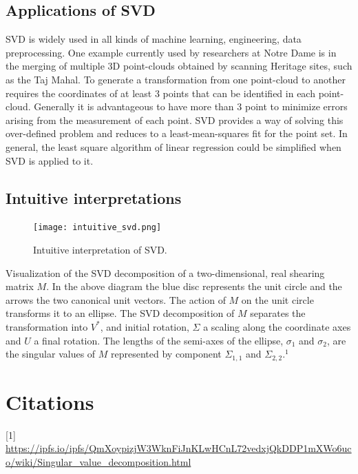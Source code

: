 \documentclass[a4paper]{article}
\begin{document}
\subsection{Applications of SVD}
\noindent SVD is widely used in all kinds of machine learning, engineering, data preprocessing. One example currently used by researchers at Notre Dame is in the merging of multiple 3D point-clouds obtained by scanning Heritage sites, such as the Taj Mahal. To generate a transformation from one point-cloud to another requires the coordinates of at least 3 points that can be identified in each point-cloud. Generally it is advantageous to have more than 3 point to minimize errors arising from the measurement of each point. SVD provides a way of solving this over-defined problem and reduces to a least-mean-squares fit for the point set. In general, the least square algorithm of linear regression could be simplified when SVD is applied to it. \\

\subsection{Intuitive interpretations}
\begin{figure}[H]
\center
\texttt{[image: intuitive\_svd.png]}
\caption{Intuitive interpretation of SVD.}
\label{svd}
\end{figure}
Visualization of the SVD decomposition of a two-dimensional, real shearing matrix $M$. In the above diagram the blue disc represents the unit circle and the arrows the two canonical unit vectors. The action of $M$ on the unit circle transforms it to an ellipse. The SVD decomposition of $M$ separates the transformation into  $V^*$, and initial rotation, $\Sigma$ a scaling along the coordinate axes and $U$ a final rotation. The lengths of the semi-axes of the ellipse, $\sigma_1$ and $\sigma_2$, are the singular values of $M$ represented by component $\Sigma_{1,1}$ and $\Sigma_{2,2}$.$^1$


\section{Citations}
[1] \url{https://ipfs.io/ipfs/QmXoypizjW3WknFiJnKLwHCnL72vedxjQkDDP1mXWo6uco/wiki/Singular_value_decomposition.html}
\end{document}
